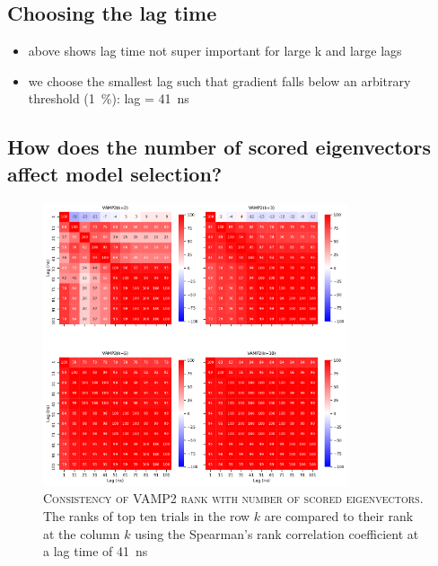 \documentclass[journal=jacsat,manuscript=article]{achemso}
\begin{document}
\subsection{Choosing the lag time}

\begin{itemize}
    \item above shows lag time not super important for large k and large lags
    \item we choose the smallest lag such that gradient  falls below an arbitrary threshold (\SI{1}{\percent}): lag = \SI{41}{\nano\second}
\end{itemize}

\subsection{How does the number of scored eigenvectors affect model selection?}

\begin{figure}
    \centering
    \includegraphics[width=0.8\textwidth]{figures/1fme_vamp_rank_vs_lag.pdf}
    \caption{\textsc{Consistency of VAMP2 rank with number of scored eigenvectors}. The ranks of top ten trials in the row $k$ are compared to their rank at the column $k$ using the Spearman's rank correlation coefficient at a lag time of \SI{41}{\nano\second}}
    \label{fig:vamp_rank_vs_n_procs}
\end{figure}
\end{document}
